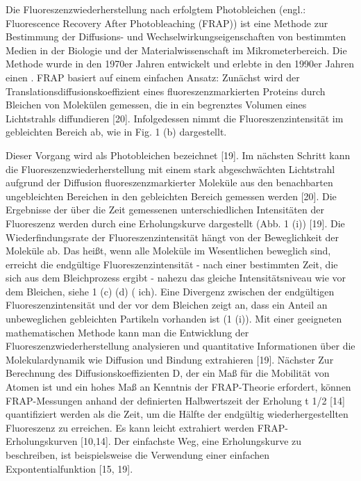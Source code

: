Die Fluoreszenzwiederherstellung nach erfolgtem Photobleichen (engl.: Fluorescence Recovery After Photobleaching (FRAP)) ist
eine Methode zur Bestimmung der Diffusions- und Wechselwirkungseigenschaften von bestimmten Medien in der Biologie und
der Materialwissenschaft im Mikrometerbereich.
Die Methode wurde in den 1970er Jahren entwickelt und erlebte in den 1990er Jahren einen .
FRAP basiert auf einem einfachen Ansatz:
Zunächst wird der Translationsdiffusionskoeffizient eines fluoreszenzmarkierten Proteins durch Bleichen von Molekülen gemessen,
die in ein begrenztes Volumen eines Lichtstrahls diffundieren [20]. Infolgedessen nimmt die Fluoreszenzintensität im gebleichten
Bereich ab, wie in Fig. 1 (b) dargestellt.\par
Dieser Vorgang wird als Photobleichen bezeichnet [19]. Im nächsten Schritt kann die Fluoreszenzwiederherstellung mit einem stark
abgeschwächten Lichtstrahl aufgrund der Diffusion fluoreszenzmarkierter Moleküle aus den benachbarten ungebleichten Bereichen in
den gebleichten Bereich gemessen werden [20]. Die Ergebnisse der über die Zeit gemessenen unterschiedlichen Intensitäten der
Fluoreszenz werden durch eine Erholungskurve dargestellt (Abb. 1 (i)) [19]. Die Wiederfindungsrate der Fluoreszenzintensität
hängt von der Beweglichkeit der Moleküle ab. Das heißt, wenn alle Moleküle im Wesentlichen beweglich sind, erreicht die endgültige
Fluoreszenzintensität - nach einer bestimmten Zeit, die sich aus dem Bleichprozess ergibt - nahezu das gleiche Intensitätsniveau
wie vor dem Bleichen, siehe 1 (c) (d) ( ich). Eine Divergenz zwischen der endgültigen Fluoreszenzintensität und der vor dem
Bleichen zeigt an, dass ein Anteil an unbeweglichen gebleichten Partikeln vorhanden ist (1 (i)). Mit einer geeigneten
mathematischen Methode kann man die Entwicklung der Fluoreszenzwiederherstellung analysieren und quantitative Informationen über
die Molekulardynamik wie Diffusion und Bindung extrahieren [19]. Nächster Zur Berechnung des Diffusionskoeffizienten D, der ein
Maß für die Mobilität von Atomen ist und ein hohes Maß an Kenntnis der FRAP-Theorie erfordert, können FRAP-Messungen anhand der
definierten Halbwertszeit der Erholung t 1/2 [14] quantifiziert werden als die Zeit, um die Hälfte der endgültig
wiederhergestellten Fluoreszenz zu erreichen. Es kann leicht extrahiert werden FRAP-Erholungskurven [10,14]. Der einfachste Weg,
eine Erholungskurve zu beschreiben, ist beispielsweise die Verwendung einer einfachen Expontentialfunktion [15, 19].